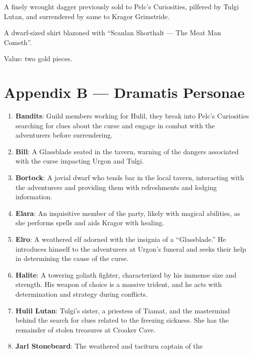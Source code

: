\documentclass[
  12pt,twoside,twocolumn,openany,nodeprecatedcode]{dndbook}
\begin{document}

A finely wrought dagger previously sold to Pelc's Curiosities, pilfered
by Tulgi Lutan, and surrendered by same to Kragor Grimstride.


A dwarf-sized shirt blazoned with ``Scanlan Shorthalt --- The Meat Man
Cometh''.

Value: two gold pieces.

\chapter{Appendix B --- Dramatis
Personae}\label{appendix-b-dramatis-personae}

\begin{enumerate}
\def\labelenumi{\arabic{enumi}.}
\item
  \textbf{Bandits}: Guild members working for Hulil, they break into
  Pelc's Curiosities searching for clues about the curse and engage in
  combat with the adventurers before surrendering.
\item
  \textbf{Bill}: A Glassblade seated in the tavern, warning of the
  dangers associated with the curse impacting Urgon and Tulgi.
\item
  \textbf{Bortock}: A jovial dwarf who tends bar in the local tavern,
  interacting with the adventurers and providing them with refreshments
  and lodging information.
\item
  \textbf{Elara}: An inquisitive member of the party, likely with
  magical abilities, as she performs spells and aids Kragor with
  healing.
\item
  \textbf{Elro}: A weathered elf adorned with the insignia of a
  ``Glassblade.'' He introduces himself to the adventurers at Urgon's
  funeral and seeks their help in determining the cause of the curse.
\item
  \textbf{Halite}: A towering goliath fighter, characterized by his
  immense size and strength. His weapon of choice is a massive trident,
  and he acts with determination and strategy during conflicts.
\item
  \textbf{Hulil Lutan}: Tulgi's sister, a priestess of Tiamat, and the
  mastermind behind the search for clues related to the freezing
  sickness. She has the remainder of stolen treasures at Croaker Cave.
\item
  \textbf{Jarl Stonebeard}: The weathered and taciturn captain of the

\end{enumerate}
\end{document}
